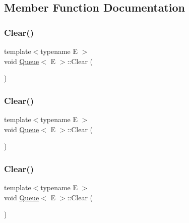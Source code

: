 \subsection{Member Function Documentation}
\mbox{\label{class_queue_acfdd5f9f7e936ca30dcf877370ef9510}} 
\subsubsection{\texorpdfstring{Clear()}{Clear()}\hspace{0.1cm}{\footnotesize\ttfamily [1/3]}}
{\footnotesize\ttfamily template$<$typename E $>$ \\
void \mbox{\hyperlink{class_queue}{Queue}}$<$ E $>$\+::Clear (\begin{DoxyParamCaption}{ }\end{DoxyParamCaption})\hspace{0.3cm}{\ttfamily [inline]}}

\mbox{\label{class_queue_acfdd5f9f7e936ca30dcf877370ef9510}} 
\subsubsection{\texorpdfstring{Clear()}{Clear()}\hspace{0.1cm}{\footnotesize\ttfamily [2/3]}}
{\footnotesize\ttfamily template$<$typename E $>$ \\
void \mbox{\hyperlink{class_queue}{Queue}}$<$ E $>$\+::Clear (\begin{DoxyParamCaption}{ }\end{DoxyParamCaption})\hspace{0.3cm}{\ttfamily [inline]}}

\mbox{\label{class_queue_acfdd5f9f7e936ca30dcf877370ef9510}} 
\subsubsection{\texorpdfstring{Clear()}{Clear()}\hspace{0.1cm}{\footnotesize\ttfamily [3/3]}}
{\footnotesize\ttfamily template$<$typename E $>$ \\
void \mbox{\hyperlink{class_queue}{Queue}}$<$ E $>$\+::Clear (\begin{DoxyParamCaption}{ }\end{DoxyParamCaption})\hspace{0.3cm}{\ttfamily [inline]}}

